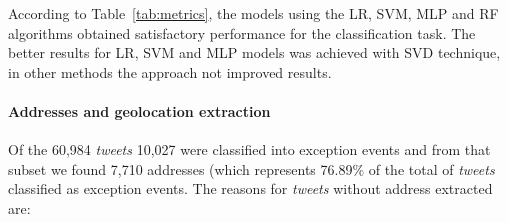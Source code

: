\documentclass[runningheads]{llncs}
\begin{document}
\begin{table}[!htb]
\centering
\caption {Metrics of the evaluations of the algorithms used to classify the \textit {tweets} in exception events}
\label {tab:metrics}
\end{table}


According to Table~\ref{tab:metrics}, the models using the LR, SVM, MLP and RF algorithms obtained satisfactory performance for the classification task. The better results for LR, SVM and MLP models was achieved with SVD technique, in other methods the approach not improved results.
 

\paragraph{\textbf{Addresses and geolocation extraction}}
Of the 60,984 \textit{tweets} 10,027 were classified into exception events and from that subset we found 7,710 addresses
(which represents 76.89\% of the total of \textit{tweets} classified as exception events. The reasons for \textit {tweets} without address extracted are:
\end{document}
